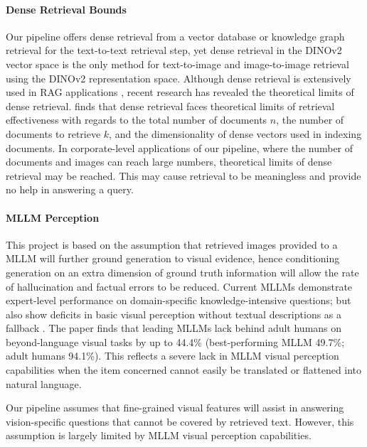 \paragraph{Dense Retrieval Bounds}
Our pipeline offers dense retrieval from a vector database or knowledge graph retrieval for the text-to-text retrieval step,
yet dense retrieval in the DINOv2 vector space is the only method for text-to-image and image-to-image retrieval using the DINOv2 representation space.
Although dense retrieval is extensively used in RAG applications \cite{lewis2021retrievalaugmentedgenerationknowledgeintensivenlp,tonmoy2024comprehensivesurveyhallucinationmitigation},
recent research has revealed the theoretical limits of dense retrieval.
\cite{weller2026theoreticallimitationsembeddingbasedretrieval} finds that dense retrieval faces theoretical limits of retrieval effectiveness
with regards to the total number of documents $n$, the number of documents to retrieve $k$, and the dimensionality of dense vectors used in indexing documents.
In corporate-level applications of our pipeline, where the number of documents and images can reach large numbers, theoretical limits of dense retrieval may be reached.
This may cause retrieval to be meaningless and provide no help in answering a query.

\paragraph{MLLM Perception}
This project is based on the assumption that retrieved images provided to a MLLM will further ground generation to visual evidence,
hence conditioning generation on an extra dimension of ground truth information will allow the rate of hallucination and factual errors to be reduced.
Current MLLMs demonstrate expert-level performance on domain-specific knowledge-intensive questions;
but also show deficits in basic visual perception without textual descriptions as a fallback \cite{chen2026babyvisionvisualreasoninglanguage}.
The paper finds that leading MLLMs lack behind adult humans on beyond-language visual tasks by up to 44.4\% (best-performing MLLM 49.7\%; adult humans 94.1\%).
This reflects a severe lack in MLLM visual perception capabilities when the item concerned cannot easily be translated or flattened into natural language.

Our pipeline assumes that fine-grained visual features will assist in answering vision-specific questions that cannot be covered by retrieved text.
However, this assumption is largely limited by MLLM visual perception capabilities.
\vspace{2mm}


